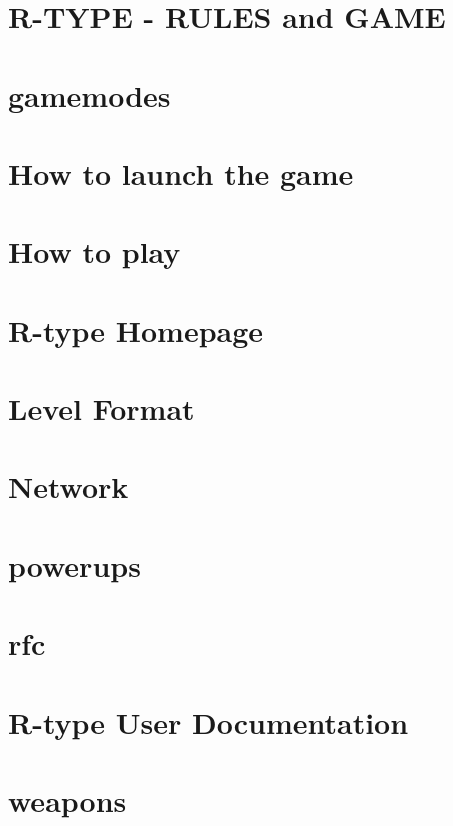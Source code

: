 \let\mypdfximage\pdfximage\def\pdfximage{\immediate\mypdfximage}\documentclass[twoside]{book}
\newcommand{\+}{\discretionary{\mbox{\scriptsize$\hookleftarrow$}}{}{}}
\begin{document}
\chapter{R-\/\+TYPE -\/ RULES and GAME}
\label{md_Game}

\chapter{gamemodes}
\label{md_gamemodes}

\chapter{How to launch the game}
\label{md_HowToLaunchTheGame}

\chapter{How to play}
\label{md_HowToPlay}

\chapter{R-\/type Homepage}
\label{md_index}

\chapter{Level Format}
\label{md_level_as_file}

\chapter{Network}
\label{md_network}

\chapter{powerups}
\label{md_powerups}

\chapter{rfc}
\label{md_rfc}

\chapter{R-\/type User Documentation}
\label{md_userdoc}

\chapter{weapons}
\label{md_weapons}

\end{document}
